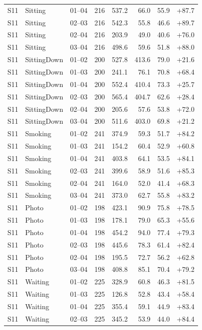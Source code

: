 \begin{center}
{\begin{longtable}{llrrrrrr}
S11 & Sitting & 01--04 & 216 & 537.2 & 66.0 & 55.9 & +87.7 \\
S11 & Sitting & 02--03 & 216 & 542.3 & 55.8 & 46.6 & +89.7 \\
S11 & Sitting & 02--04 & 216 & 203.9 & 49.0 & 40.6 & +76.0 \\
S11 & Sitting & 03--04 & 216 & 498.6 & 59.6 & 51.8 & +88.0 \\
S11 & SittingDown & 01--02 & 200 & 527.8 & 413.6 & 79.0 & +21.6 \\
S11 & SittingDown & 01--03 & 200 & 241.1 & 76.1 & 70.8 & +68.4 \\
S11 & SittingDown & 01--04 & 200 & 552.4 & 410.4 & 73.3 & +25.7 \\
S11 & SittingDown & 02--03 & 200 & 565.4 & 404.7 & 62.6 & +28.4 \\
S11 & SittingDown & 02--04 & 200 & 205.6 & 57.6 & 53.8 & +72.0 \\
S11 & SittingDown & 03--04 & 200 & 511.6 & 403.0 & 69.8 & +21.2 \\
S11 & Smoking & 01--02 & 241 & 374.9 & 59.3 & 51.7 & +84.2 \\
S11 & Smoking & 01--03 & 241 & 154.2 & 60.4 & 52.9 & +60.8 \\
S11 & Smoking & 01--04 & 241 & 403.8 & 64.1 & 53.5 & +84.1 \\
S11 & Smoking & 02--03 & 241 & 399.6 & 58.9 & 51.6 & +85.3 \\
S11 & Smoking & 02--04 & 241 & 164.0 & 52.0 & 41.4 & +68.3 \\
S11 & Smoking & 03--04 & 241 & 373.0 & 62.7 & 55.8 & +83.2 \\
S11 & Photo & 01--02 & 198 & 423.1 & 90.9 & 75.8 & +78.5 \\
S11 & Photo & 01--03 & 198 & 178.1 & 79.0 & 65.3 & +55.6 \\
S11 & Photo & 01--04 & 198 & 454.2 & 94.0 & 77.4 & +79.3 \\
S11 & Photo & 02--03 & 198 & 445.6 & 78.3 & 61.4 & +82.4 \\
S11 & Photo & 02--04 & 198 & 195.5 & 72.7 & 56.2 & +62.8 \\
S11 & Photo & 03--04 & 198 & 408.8 & 85.1 & 70.4 & +79.2 \\
S11 & Waiting & 01--02 & 225 & 328.9 & 60.8 & 46.3 & +81.5 \\
S11 & Waiting & 01--03 & 225 & 126.8 & 52.8 & 43.4 & +58.4 \\
S11 & Waiting & 01--04 & 225 & 355.4 & 59.1 & 44.9 & +83.4 \\
S11 & Waiting & 02--03 & 225 & 345.2 & 53.9 & 44.0 & +84.4 \\

\end{longtable}}
\end{center}
